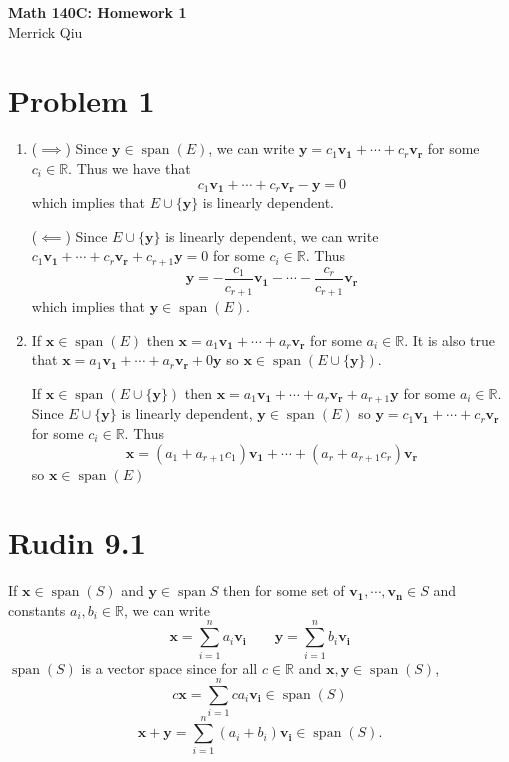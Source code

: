 \documentclass{article}
\DeclareMathOperator{\Span}{span}
\begin{document}
\begin{center}
	\huge{\bf Math 140C: Homework 1} \\
	Merrick Qiu
\end{center}

\section*{Problem 1}
\begin{enumerate}
  \item ($\implies$) Since $\bm{y} \in \Span(E)$, we can write $\bm{y} = c_1\bm{v_1} + \cdots + c_r\bm{v_r}$
  for some $c_i \in \mathbb{R}$. Thus we have that
  \[
    c_1\bm{v_1} + \cdots + c_r\bm{v_r} - \bm{y} = 0
  \]
  which implies that $E \cup \{\bm{y}\}$ is linearly dependent.
  
  ($\impliedby$) Since $E \cup \{\bm{y}\}$ is linearly dependent,
  we can write 
  $c_1\bm{v_1} + \cdots + c_r\bm{v_r} + c_{r+1}\bm{y} = 0$
  for some $c_i \in \mathbb{R}$.
  Thus 
  \[
    \bm{y} = -\frac{c_1}{c_{r+1}}\bm{v_1} - \cdots - \frac{c_r}{c_{r+1}}\bm{v_r} 
  \]
  which implies that $\bm{y} \in \Span(E)$.

  \item 
  If $\bm{x} \in \Span(E)$ then $\bm{x} = a_1\bm{v_1} + \cdots + a_r\bm{v_r}$ 
  for some $a_i \in \mathbb{R}$.
  It is also true that $\bm{x} = a_1\bm{v_1} + \cdots + a_r\bm{v_r} + 0\bm{y}$ 
  so $\bm{x} \in \Span(E\cup \{\bm{y}\})$. 

  If $\bm{x} \in \Span(E \cup \{\bm{y}\})$ then
  $\bm{x} = a_1\bm{v_1} + \cdots + a_r\bm{v_r} + a_{r+1}\bm{y}$  for some $a_i \in \mathbb{R}$.
  Since $E \cup \{\bm{y}\}$ is linearly dependent, $\bm{y} \in \Span(E)$ so 
  $\bm{y} = c_1\bm{v_1} + \cdots + c_r\bm{v_r}$ for some $c_i \in \mathbb{R}$.
  Thus 
  \[
    \bm{x} = (a_1 + a_{r+1}c_1)\bm{v_1} + \cdots + (a_r + a_{r+1}c_r)\bm{v_r}
  \]
  so $\bm{x} \in \Span(E)$
\end{enumerate}
\newpage 
\section*{Rudin 9.1}
If $\bm{x} \in \Span(S)$ and $\bm{y} \in \Span{S}$ then for some 
set of $\bm{v_1},\cdots,\bm{v_n} \in S$  and constants $a_i, b_i \in \mathbb{R}$, we can write
\[
  \bm{x} = \sum_{i=1}^{n} a_i \bm{v_i} \qquad  \bm{y} = \sum_{i=1}^{n} b_i \bm{v_i}
\]
$\Span(S)$ is a vector space since for all $c \in \mathbb{R}$ and $\bm{x}, \bm{y} \in \Span(S)$,
\[
  c\bm{x} = \sum_{i=1}^{n} ca_i \bm{v_i} \in \Span(S)
\]
\[
  \bm{x} + \bm{y} = \sum_{i=1}^{n} (a_i + b_i) \bm{v_i} \in \Span(S).
\]
\newpage
\end{document}

